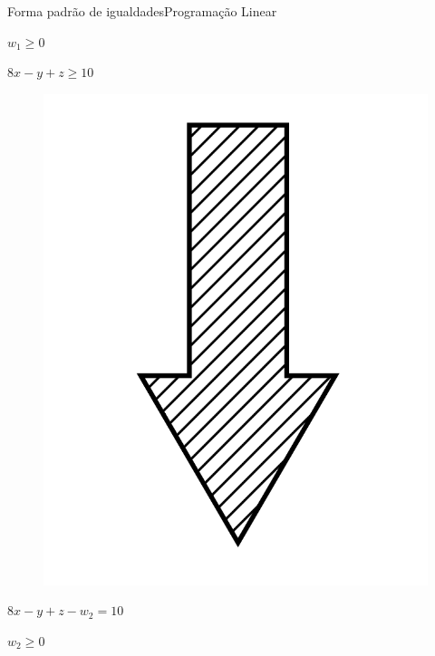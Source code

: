 \documentclass[t]{beamer}
\begin{document}
\begin{ftst}{Forma padrão de igualdades}{Programação Linear}
\begin{minipage}{0.45\linewidth}
        \centering $w_1 \geq 0$
\end{minipage}
\hspace{0.05\linewidth}
\begin{minipage}{0.45\linewidth}
        \centering $8x - y + z \geq 10$
        \begin{figure}[H]
            \centering
            \includegraphics[scale=0.05]{Figuras/seta.png}
        \end{figure}
        \centering $8x - y + z - w_2 = 10$
        
        \centering $w_2 \geq 0$
\end{minipage}
\end{ftst}

\end{document}
